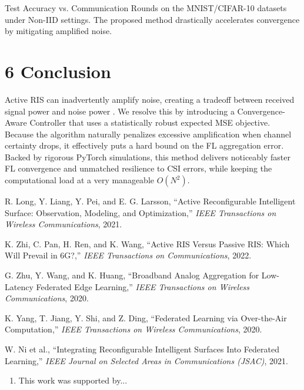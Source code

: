 \documentclass[10pt,twocolumn]{article}
\begin{document}
Test Accuracy vs. Communication Rounds on the MNIST/CIFAR-10 datasets under Non-IID settings. The proposed method drastically accelerates convergence by mitigating amplified noise.
\section{6	Conclusion}

Active RIS can inadvertently amplify noise, creating a tradeoff between received signal power and noise power  \parencite{ruizhe_long_83e9453a}. We resolve this by introducing a Convergence-Aware Controller that uses a statistically robust expected MSE objective. Because the algorithm naturally penalizes excessive amplification when channel certainty drops, it effectively puts a hard bound on the FL aggregation error. Backed by rigorous PyTorch simulations, this method delivers noticeably faster FL convergence and unmatched resilience to CSI errors, while keeping the computational load at a very manageable $O(N^{2})$.



R. Long, Y. Liang, Y. Pei, and E. G. Larsson, “Active Reconfigurable Intelligent Surface: Observation, Modeling, and Optimization,” \textit{IEEE Transactions on Wireless Communications}, 2021.

K. Zhi, C. Pan, H. Ren, and K. Wang, “Active RIS Versus Passive RIS: Which Will Prevail in 6G?,” \textit{IEEE Transactions on Communications}, 2022.

G. Zhu, Y. Wang, and K. Huang, “Broadband Analog Aggregation for Low-Latency Federated Edge Learning,” \textit{IEEE Transactions on Wireless Communications}, 2020.

K. Yang, T. Jiang, Y. Shi, and Z. Ding, “Federated Learning via Over-the-Air Computation,” \textit{IEEE Transactions on Wireless Communications}, 2020.

W. Ni et al., “Integrating Reconfigurable Intelligent Surfaces Into Federated Learning,” \textit{IEEE Journal on Selected Areas in Communications (JSAC)}, 2021.
\begin{enumerate}
\item 

 This work was supported by...


\end{enumerate}
\printbibliography
\end{document}
